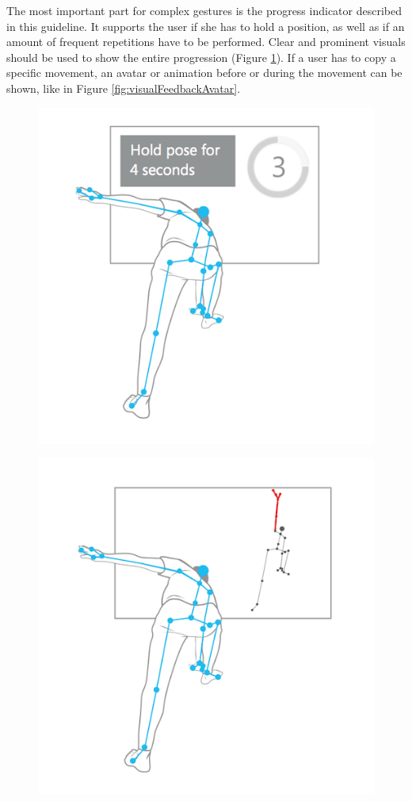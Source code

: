 The most important part for complex gestures is the progress indicator described in this guideline. It supports the user if she has to hold a position, as well as if an amount of frequent repetitions have to be performed. Clear and prominent visuals should be used to show the entire progression (Figure \ref{fig:visualFeedbackIndicator}). If a user has to copy a specific movement, an avatar or animation before or during the movement can be shown, like in Figure \ref{fig:visualFeedbackAvatar}.
\begin{figure}[htb]
	\centering
	\begin{minipage}[t]{0.49\linewidth}
		\centering
		\includegraphics[width=0.9\linewidth]{Pictures/2_4_visualFeedbackIndicator}
		\label{fig:visualFeedbackIndicator}
	\end{minipage}
	\hfill
	\begin{minipage}[t]{0.49\linewidth}
		\centering
		\includegraphics[width=0.9\linewidth]{Pictures/2_4_visualFeedbackAvatar}

\end{minipage}
\end{figure}
